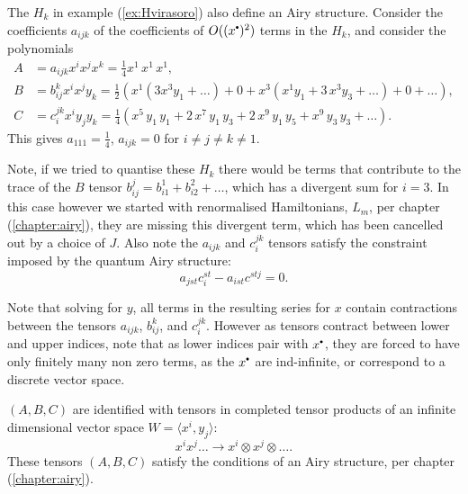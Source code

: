     The \( H_k\) in example (\ref{ex:Hvirasoro}) also define an Airy structure. Consider the coefficients \(a_{ijk}\) of the coefficients of \(O((x^{\sbt})^2)\) terms in the \(H_k\), and consider the polynomials
    \begin{align*} 
    A &= a_{ijk} x^i x^j x^k = \frac{1}{4} x^1 \,x^1 \,x^1, \\
    B &= b_{ij}^k x^i x^j y_k = \frac{1}{2} \left(  x^1 \left(  3 x^3 y_{1} + \dots  \right) + 0   + x^3 \left( x^1 y_1 + 3 \, x^3 y_3 + \dots   \right) + 0  + \dots   \right) , \\
    C &= c_{i}^{jk} x^i y_j y_k = \frac{1}{4} \left( x^5 \,y_1 \,y_1 + 2 \,x^7 \,y_1\, y_3 + 2 \,x^9\,y_1 \,y_5 + x^9 \,y_3\, y_3 + \dots  \right).
    \end{align*}
    This gives \( a_{111} = \frac{1}{4}\), \( a_{ijk} = 0\) for \(i\neq j \neq k \neq 1\). 
    \begin{rem}
    Note, if we tried to quantise these \(H_k\) there would be terms that contribute to the trace of the \(B\) tensor \(b_{ij}^{j} = b_{i1}^{1} + b_{i2}^{2} + \dots \), which has a divergent sum for \(i=3\). In this case however we started with renormalised Hamiltonians, \(L_m\), per chapter (\ref{chapter:airy}), they are missing  this divergent term, which has been cancelled out by a choice of \(J\). Also note the \( a_{ijk} \) and \(c_{i}^{jk}\) tensors satisfy the constraint imposed by the quantum Airy structure:
    \[ a_{jst} c^{st}_i - a_{ist} c^{st j } = 0.\]
    \end{rem}
    
    \begin{rem}
    Note that solving for \(y\), all terms in the resulting series for \(x\) contain contractions between the tensors \(a_{ijk}\), \(b_{ij}^k\), and \( c_{i}^{jk}\). However as tensors contract between lower and upper indices, note that as lower indices pair with \(x^{\sbt}\), they are forced to have only finitely many non zero terms, as the \(x^{\sbt}\) are ind-infinite, or correspond to a discrete vector space.
    \end{rem}
    
    \((A,B,C)\) are identified with tensors in completed tensor products of an infinite dimensional vector space \(W = \langle x^i , y_j \rangle \):
    \[ x^i x^j \dots \rightarrow x^i \otimes x^j \otimes \dots . \]
    These tensors \( (A,B,C)\) satisfy the conditions of an Airy structure, per chapter (\ref{chapter:airy}).
    
